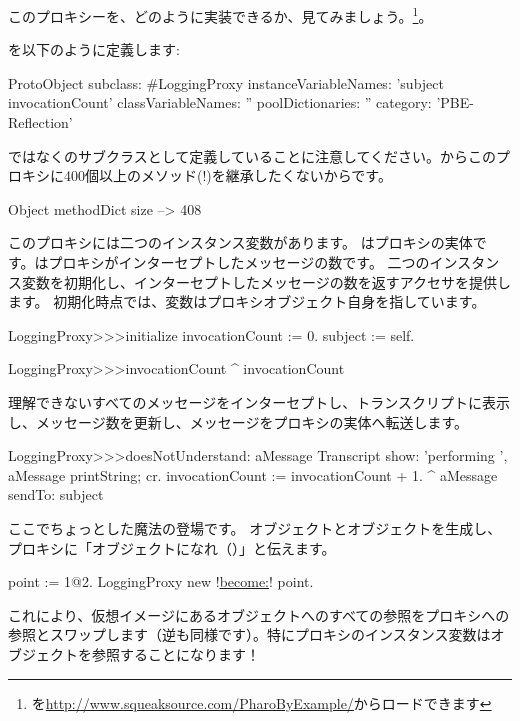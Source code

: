 \documentclass[a4paper,10pt,twoside]{book}
\begin{document}
このプロキシーを、どのように実装できるか、見てみましょう。\footnote{を\url{http://www.squeaksource.com/PharoByExample/}からロードできます}。

を以下のように定義します:
\begin{code}{}
ProtoObject subclass: #LoggingProxy
	instanceVariableNames: 'subject invocationCount'
	classVariableNames: ''
	poolDictionaries: ''
	category: 'PBE-Reflection'
\end{code}
ではなくのサブクラスとして定義していることに注意してください。からこのプロキシに400個以上のメソッド(!)を継承したくないからです。

\begin{code}{}
Object methodDict size --> 408
\end{code}

このプロキシには二つのインスタンス変数があります。  はプロキシの実体です。はプロキシがインターセプトしたメッセージの数です。
二つのインスタンス変数を初期化し、インターセプトしたメッセージの数を返すアクセサを提供します。
初期化時点では、変数はプロキシオブジェクト自身を指しています。
\begin{code}{}
LoggingProxy>>>initialize
	invocationCount := 0.
	subject := self.
\end{code}

\begin{code}{}
LoggingProxy>>>invocationCount
	^ invocationCount
\end{code}

理解できないすべてのメッセージをインターセプトし、トランスクリプトに表示し、メッセージ数を更新し、メッセージをプロキシの実体へ転送します。

\begin{code}{}
LoggingProxy>>>doesNotUnderstand: aMessage 
	Transcript show: 'performing ', aMessage printString; cr.
	invocationCount := invocationCount + 1.
	^ aMessage sendTo: subject
\end{code}

ここでちょっとした魔法の登場です。
オブジェクトとオブジェクトを生成し、プロキシに「オブジェクトになれ（）」と伝えます。
\begin{code}{}
point := 1@2.
LoggingProxy new !\underline{become:}! point.
\end{code}

これにより、仮想イメージにあるオブジェクトへのすべての参照をプロキシへの参照とスワップします（逆も同様です）。特にプロキシのインスタンス変数はオブジェクトを参照することになります！
\end{document}
